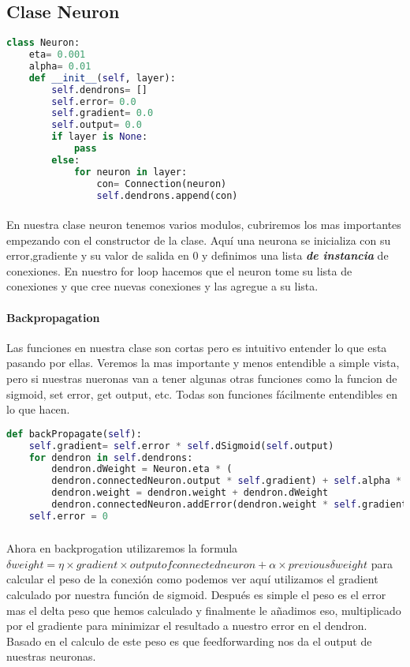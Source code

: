 \subsection{Clase Neuron}
\begin{lstlisting}[language=Python]
class Neuron:
	eta= 0.001
	alpha= 0.01
	def __init__(self, layer):
		self.dendrons= []
		self.error= 0.0
		self.gradient= 0.0
		self.output= 0.0
		if layer is None:
			pass
		else:
			for neuron in layer:
				con= Connection(neuron)
				self.dendrons.append(con)
\end{lstlisting}
\paragraph{}En nuestra clase neuron tenemos varios modulos, cubriremos los mas importantes empezando con el constructor de la clase. Aqu\'i una neurona se inicializa con su error,gradiente y su valor de salida en 0 y definimos una lista \textbf{\emph{de instancia}} de conexiones. En nuestro for loop hacemos que el neuron tome su lista de conexiones y que cree nuevas conexiones y las agregue a su lista.

\paragraph{Backpropagation} Las funciones en nuestra clase son cortas pero es intuitivo entender lo que esta pasando por ellas. Veremos la mas importante y menos entendible a simple vista, pero si nuestras nueronas van a tener algunas otras funciones como la funcion de sigmoid, set error, get output, etc. Todas son funciones f\'acilmente entendibles en lo que hacen.
\begin{lstlisting}[language=Python]
def backPropagate(self):
	self.gradient= self.error * self.dSigmoid(self.output)
	for dendron in self.dendrons:
		dendron.dWeight = Neuron.eta * (
		dendron.connectedNeuron.output * self.gradient) + self.alpha * dendron.dWeight
		dendron.weight = dendron.weight + dendron.dWeight
		dendron.connectedNeuron.addError(dendron.weight * self.gradient)
	self.error = 0
\end{lstlisting}
\subparagraph{} Ahora en backprogation utilizaremos la formula \( \delta weight= \eta \times gradient \times output of connected neuron + \alpha \times previous \delta weight \) para calcular el peso de la conexi\'on como podemos ver aqu\'i utilizamos el gradient calculado por nuestra funci\'on de sigmoid. Despu\'es es simple el peso es el error mas el delta peso que hemos calculado y finalmente le a\~nadimos eso, multiplicado por el gradiente para minimizar el resultado a nuestro error en el dendron. Basado en el calculo de este peso es que feedforwarding nos da el output de nuestras neuronas.
